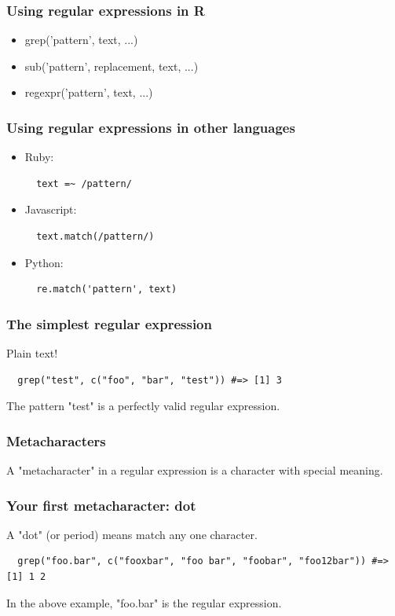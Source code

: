 \documentclass{beamer}
\begin{document}
\begin{frame}
  \frametitle{Using regular expressions in R}
  \begin{itemize}
    \item grep('pattern', text, ...)
    \item sub('pattern', replacement, text, ...)
    \item regexpr('pattern', text, ...)
  \end{itemize}
\end{frame}
\begin{frame}[fragile]
  \frametitle{Using regular expressions in other languages}
  \begin{itemize}
    \item Ruby:
\begin{verbatim}
  text =~ /pattern/
\end{verbatim}
    \item Javascript:
\begin{verbatim}
  text.match(/pattern/)
\end{verbatim}
    \item Python:
\begin{verbatim}
  re.match('pattern', text)
\end{verbatim}
  \end{itemize}
\end{frame}
\begin{frame}[fragile]
  \frametitle{The simplest regular expression}
  Plain text!
  \vspace{3mm}

\begin{verbatim}
  grep("test", c("foo", "bar", "test")) #=> [1] 3
\end{verbatim}
  \vspace{10mm}
  The pattern "test" is a perfectly valid regular expression.
\end{frame}
\begin{frame}
  \frametitle{Metacharacters}
  A "metacharacter" in a regular expression is a character with special meaning.
\end{frame}
\begin{frame}[fragile]
  \frametitle{Your first metacharacter: dot}
  A "dot" (or period) means match any one character.
  \vspace{3mm}

\begin{verbatim}
  grep("foo.bar", c("fooxbar", "foo bar", "foobar", "foo12bar")) #=> [1] 1 2
\end{verbatim}
  \vspace{10mm}
  In the above example, "foo.bar" is the regular expression.
\end{frame}
\end{document}
